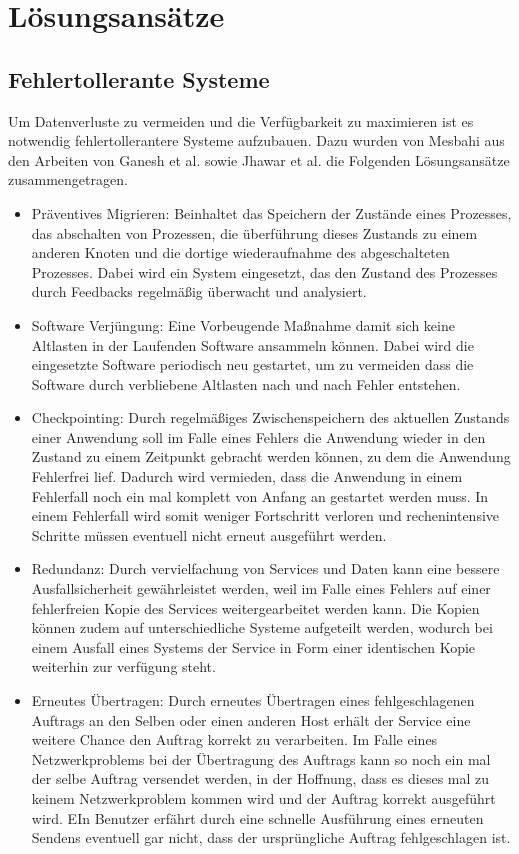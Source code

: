 \section{Lösungsansätze}

\subsection{Fehlertollerante Systeme}
Um Datenverluste zu vermeiden und die Verfügbarkeit zu maximieren ist es notwendig fehlertollerantere Systeme aufzubauen. Dazu wurden von Mesbahi \cite{mesbahi2018} aus den Arbeiten von Ganesh et al. \cite{ganesh2014} sowie Jhawar et al. \cite{jhawar2013}die Folgenden Lösungsansätze zusammengetragen.

\begin{itemize}
\item
Präventives Migrieren: Beinhaltet das Speichern der Zustände eines Prozesses, das abschalten von Prozessen, die überführung dieses Zustands zu einem anderen Knoten und die dortige wiederaufnahme des abgeschalteten Prozesses.
Dabei wird ein System eingesetzt, das den Zustand des Prozesses durch Feedbacks regelmäßig überwacht und analysiert. 

\item
Software Verjüngung: Eine Vorbeugende Maßnahme damit sich keine Altlasten in der Laufenden Software ansammeln können. Dabei wird die eingesetzte Software periodisch neu gestartet, um zu vermeiden dass die Software durch verbliebene Altlasten nach und nach Fehler entstehen.
\item
Checkpointing: Durch regelmäßiges Zwischenspeichern des aktuellen Zustands einer Anwendung soll im Falle eines Fehlers die Anwendung wieder in den Zustand zu einem Zeitpunkt gebracht werden können, zu dem die Anwendung Fehlerfrei lief. Dadurch wird vermieden, dass die Anwendung in einem Fehlerfall noch ein mal komplett von Anfang an gestartet werden muss. In einem Fehlerfall wird somit weniger Fortschritt verloren und rechenintensive Schritte müssen eventuell nicht erneut ausgeführt werden.
\item
Redundanz: Durch vervielfachung von Services und Daten kann eine bessere Ausfallsicherheit gewährleistet werden, weil im Falle eines Fehlers auf einer fehlerfreien Kopie des Services weitergearbeitet werden kann. Die Kopien können zudem auf unterschiedliche Systeme aufgeteilt werden, wodurch bei einem Ausfall eines Systems der Service in Form einer identischen Kopie weiterhin zur verfügung steht.
\item
Erneutes Übertragen: Durch erneutes Übertragen eines fehlgeschlagenen Auftrags an den Selben oder einen anderen Host erhält der Service eine weitere Chance den Auftrag korrekt zu verarbeiten. Im Falle eines Netzwerkproblems bei der Übertragung des Auftrags kann so noch ein mal der selbe Auftrag versendet werden, in der Hoffnung, dass es dieses mal zu keinem Netzwerkproblem kommen wird und der Auftrag korrekt ausgeführt wird. EIn Benutzer erfährt durch eine schnelle Ausführung eines erneuten Sendens eventuell gar nicht, dass der ursprüngliche Auftrag fehlgeschlagen ist.

\end{itemize}

